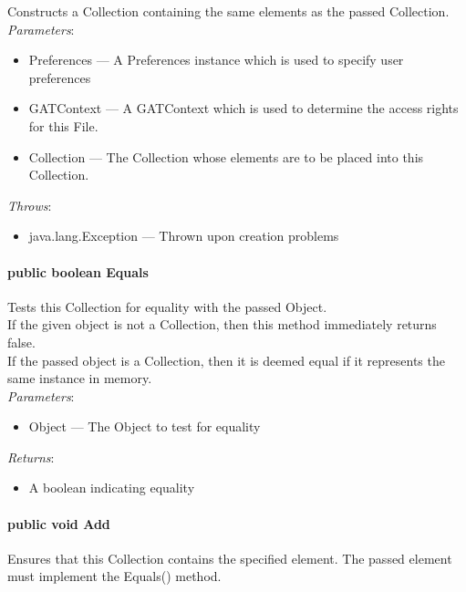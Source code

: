 \documentclass[$Date: 2003/06/26 19:29:31 $]{glabarticle}
\begin{document}
Constructs a Collection containing the same elements as the passed
Collection.\\

\textit{Parameters}:
\begin{itemize}
\item[] Preferences --- A Preferences instance which is used to specify user preferences
\item[] GATContext --- A GATContext which is used to determine the access rights for this File.
\item[] Collection ---  The Collection whose elements are to be placed into this Collection.
\end{itemize}

 \textit{Throws}:
 \begin{itemize}
 \item[] java.lang.Exception --- Thrown upon creation problems 
 \end{itemize}

\paragraph{public boolean Equals}

Tests this Collection for equality with the passed Object. \\

 If the given object is not a Collection, then this method immediately
 returns false. \\
 
 If the passed object is a Collection, then it is deemed equal if it
 represents the same instance in memory.\\
  
\textit{Parameters}:
\begin{itemize}
\item[] Object --- The Object to test for equality 
\end{itemize}

\textit{Returns}:
\begin{itemize}
\item[] A boolean indicating equality
\end{itemize}

\paragraph{public void Add}

Ensures that this Collection contains the specified element. The
passed element must implement the Equals() method.\\
\end{document}
